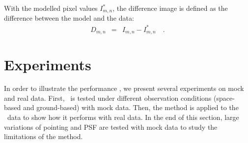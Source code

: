 With the modelled pixel values $I^{\ast}_{m,n}$, the difference image is defined as the difference between the model and the data:
\begin{eqnarray}
D_{m,n} &=& I_{m,n} - I^{\ast}_{m,n}
\quad.
\end{eqnarray}

\section{Experiments}
In order to illustrate the performance \cpmdiff, we present several experiments on mock and real data. 
First, \cpmdiff\ is tested under different observation conditions (space-based and ground-based) with mock data. 
Then,  the method is applied to the \KTCN\ data to show how it performs with real data. 
In the end of this section,  large variations of pointing and PSF are tested with mock data to study the limitations of the method.

